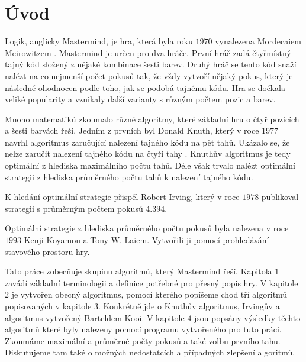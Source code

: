\chapter*{Úvod}

Logik, anglicky Mastermind, je hra, která byla roku $1970$ vynalezena Mordecaiem Meirowitzem \cite{Nelson-history}. Mastermind je určen pro dva hráče. První hráč zadá čtyřmístný tajný kód složený z nějaké kombinace šesti barev. Druhý hráč se tento kód snaží nalézt na co nejmenší počet pokusů tak, že vždy vytvoří nějaký pokus, který je následně ohodnocen podle toho, jak se podobá tajnému kódu. Hra se dočkala veliké popularity a vznikaly další varianty s různým počtem pozic a barev. 

Mnoho matematiků zkoumalo různé algoritmy, které základní hru o čtyř pozicích a šesti barvách řeší. Jedním z prvních byl Donald Knuth, který v roce $1977$ navrhl algoritmus zaručující nalezení tajného kódu na pět tahů\cite{donald_e__knuth_1977}. Ukázalo se, že nelze zaručit nalezení tajného kódu na čtyři tahy \cite{koyama}. Knuthův algoritmus je tedy optimální z hlediska maximálního počtu tahů. Déle však trvalo nalézt optimální strategii z hlediska průměrného počtu tahů k nalezení tajného kódu. 

K hledání optimální strategie přispěl Robert Irving, který v roce $1978$ publikoval strategii s průměrným počtem pokusů $4.394$. 

Optimální strategie z hlediska průměrného počtu pokusů byla nalezena v roce $1993$ Kenji Koyamou a Tony W. Laiem. Vytvořili ji pomocí prohledávání stavového prostoru hry. 

Tato práce zobecňuje skupinu algoritmů, který Mastermind řeší. Kapitola $1$ zavádí základní terminologii a definice potřebné pro přesný popis hry. V kapitole $2$ je vytvořen obecný algoritmus, pomocí kterého popíšeme chod tří algoritmů popisovaných v kapitole $3$. Konkrétně jde o Knuthův algoritmus, Irvingův a algoritmus vytvořený Barteldem Kooi. V kapitole $4$ jsou popsány výsledky těchto algoritmů které byly nalezeny pomocí programu vytvořeného pro tuto práci. Zkoumáme maximální a průměrné počty pokusů a také volbu prvního tahu. Diskutujeme tam také o možných nedostatcích a případných zlepšení algoritmů. 